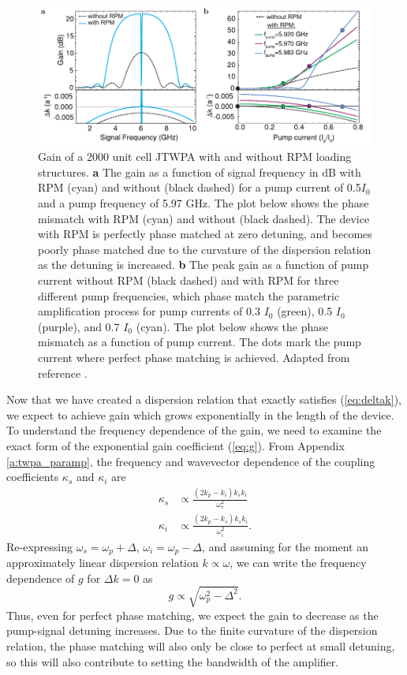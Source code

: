 \begin{figure}
\begin{center}
\includegraphics[width = 6in]{twpa_theory/twpa_gain}
\end{center}
\caption[JTWPA gain and phase mismatch]{Gain of a 2000 unit cell JTWPA with and without RPM loading structures. \textbf{a} The gain as a function of signal frequency in dB with RPM (cyan) and without (black dashed) for a pump current of 0.5$I_0$ and a pump frequency of 5.97 GHz.  The plot below shows the phase mismatch with RPM (cyan) and without (black dashed).  The device with RPM is perfectly phase matched at zero detuning, and becomes poorly phase matched due to the curvature of the dispersion relation as the detuning is increased.  \textbf{b} The peak gain as a function of pump current without RPM (black dashed) and with RPM for three different pump frequencies, which phase match the parametric amplification process for pump currents of 0.3 $I_0$ (green), 0.5 $I_0$ (purple), and 0.7 $I_0$ (cyan). The plot below shows the phase mismatch as a function of pump current. The dots mark the pump current where perfect phase matching is achieved.  Adapted from reference \cite{OBrien2014}.}
\label{fig:twpa_gain}
\end{figure}

Now that we have created a dispersion relation that exactly satisfies (\ref{eq:deltak}), we expect to achieve gain which grows exponentially in the length of the device.  To understand the frequency dependence of the gain, we need to examine the exact form of the exponential gain coefficient (\ref{eq:g}).  From Appendix \ref{a:twpa_paramp}, the frequency and wavevector dependence of the coupling coefficients $\kappa_s$ and $\kappa_i$ are
\begin{align}
\kappa_s &\propto \frac{(2 k_p - k_i) k_s k_i}{\omega_s^2} \\
\kappa_i &\propto \frac{(2 k_p - k_s) k_s k_i}{\omega_i^2}.
\end{align}
Re-expressing $\omega_s = \omega_p + \Delta$, $\omega_i = \omega_p - \Delta$, and assuming for the moment an approximately linear dispersion relation $k \propto \omega$, we can write the frequency dependence of $g$ for $\Delta k = 0$ as
\begin{equation}
g \propto \sqrt{\omega_p^2 - \Delta^2}.
\label{eq:g_vs_f}
\end{equation}
Thus, even for perfect phase matching, we expect the gain to decrease as the pump-signal detuning increases.  Due to the finite curvature of the dispersion relation, the phase matching will also only be close to perfect at small detuning, so this will also contribute to setting the bandwidth of the amplifier.

